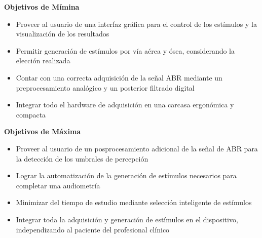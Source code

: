 \textbf{Objetivos de Mímina}

\begin{itemize}
    \item Proveer al usuario de una interfaz gráfica para el control de los estímulos y la visualización de los resultados
    \item Permitir generación de estímulos por vía aérea y ósea, considerando la elección realizada
    \item Contar con una correcta adquisición de la señal ABR mediante un preprocesamiento analógico y un posterior filtrado digital
    \item Integrar todo el hardware de adquisición en una carcasa ergonómica y compacta
\end{itemize}

\newpage

\textbf{Objetivos de Máxima}

\begin{itemize}
    \item Proveer al usuario de un posprocesamiento adicional de la señal de ABR para la detección de los umbrales de percepción
    \item Lograr la automatización de la generación de estímulos necesarios para completar una audiometría
    \item Minimizar del tiempo de estudio mediante selección inteligente de estímulos
    \item Integrar toda la adquisición y generación de estímulos en el dispositivo, independizando al paciente del profesional clínico
\end{itemize}
